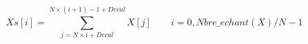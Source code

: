 \[
Xs[i] = \sum_{j= N\times i + Decal}^{N\times (i+1) -1 + Decal} X[j] 
 \qquad i=0, Nbre\_echant(X)/N -1 
\]

